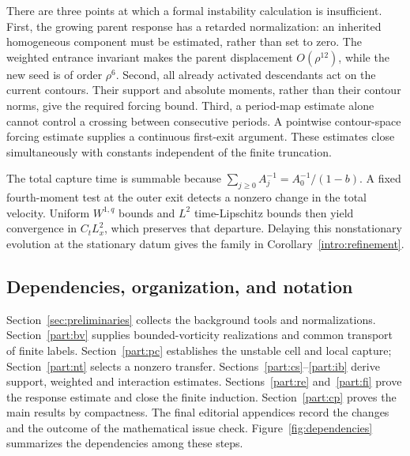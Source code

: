 \documentclass[11pt]{amsart}
\theoremstyle{remark}
\numberwithin{equation}{section}
\begin{document}
There are three points at which a formal instability calculation is
insufficient. First, the growing parent response has a retarded
normalization: an inherited homogeneous component must be estimated,
rather than set to zero. The weighted entrance invariant makes the
parent displacement $O(\rho^{12})$, while the new seed is of order
$\rho^6$. Second, all already activated descendants act on the current
contours. Their support and absolute moments, rather than their contour
norms, give the required forcing bound. Third, a period-map estimate
alone cannot control a crossing between consecutive periods. A
pointwise contour-space forcing estimate supplies a continuous
first-exit argument. These estimates close simultaneously with
constants independent of the finite truncation.

The total capture time is summable because
$\sum_{j\ge0}A_j^{-1}=A_0^{-1}/(1-b)$. A fixed fourth-moment test at
the outer exit detects a nonzero change in the total velocity. Uniform
$W^{1,q}$ bounds and $L^2$ time-Lipschitz bounds then yield convergence
in $C_tL^2_x$, which preserves that departure. Delaying this
nonstationary evolution at the stationary datum gives the family in
Corollary~\ref{intro:refinement}.

\subsection{Dependencies, organization, and notation}
Section~\ref{sec:preliminaries} collects the background tools and
normalizations. Section~\ref{part:bv} supplies bounded-vorticity
realizations and common transport of finite labels.
Section~\ref{part:pc} establishes the unstable cell and local capture;
Section~\ref{part:nt} selects a nonzero transfer.
Sections~\ref{part:cs}--\ref{part:ib} derive support, weighted and
interaction estimates. Sections~\ref{part:re} and~\ref{part:fi} prove
the response estimate and close the finite induction.
Section~\ref{part:cp} proves the main results by compactness.
The final editorial appendices record the changes and the outcome of
the mathematical issue check.
Figure~\ref{fig:dependencies} summarizes the dependencies among these steps.
\end{document}

